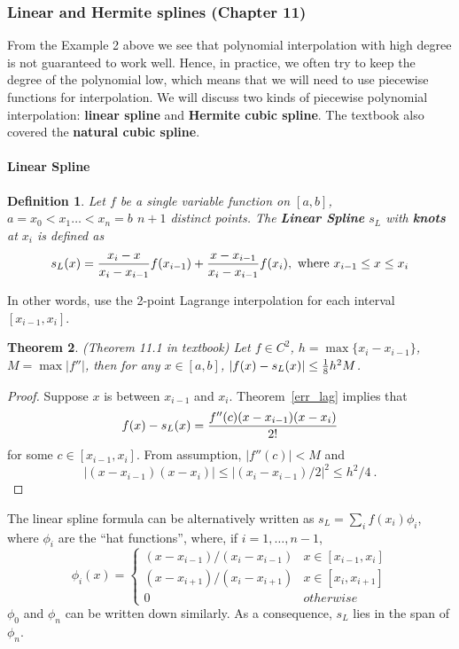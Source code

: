\documentclass[20pt]{article} %
\theoremstyle{break}
\newtheorem{definition}{Definition}[section]
\newtheorem{thm}[definition]{Theorem}
\begin{document}
\subsubsection{Linear and Hermite splines (Chapter 11)}

From the Example 2 above we see that polynomial interpolation with high degree is not guaranteed to work well. Hence, in practice, we often try to keep the degree of the polynomial low, which means that we will need to use piecewise functions for interpolation. We will discuss two kinds of piecewise polynomial interpolation: {\bf linear spline} and {\bf Hermite cubic spline}. The textbook also covered the {\bf natural cubic spline}.

\paragraph{Linear Spline}

\begin{definition}
  Let $f$ be a single variable function on $[a, b]$, $a=x_0<x_1\dots <x_n=b$ $n+1$ distinct points. The {\bf Linear Spline} $s_L$ with {\bf knots} at $x_i$ is defined as
  \[s_L(x)={x_i-x\over x_i-x_{i-1}}f(x_{i-1})+{x-x_{i-1}\over x_i-x_{i-1}}f(x_i), \text{ where }x_{i-1}\leq x\leq x_i\]
\end{definition}
In other words, use the 2-point Lagrange interpolation for each interval $[x_{i-1}, x_i]$.\\

\newpage

\begin{thm}\label{err_spline_lin} (Theorem 11.1 in textbook)
Let $f\in C^2$, $h=\max\{x_i-x_{i-1}\}$, $M=\max|f''|$, then for any $x\in [a, b]$, $|f(x)-s_L(x)|\leq {1\over 8}h^2M$.
\end{thm}

\begin{proof}
  Suppose $x$ is between $x_{i-1}$ and $x_i$. Theorem~\ref{err_lag} implies that
  \[f(x)-s_L(x)={f''(c)(x-x_{i-1})(x-x_i)\over 2!}\]
  for some $c\in [x_{i-1}, x_i]$. From assumption, $|f''(c)|<M$ and
  \[|(x-x_{i-1})(x-x_i)|\leq|(x_i-x_{i-1})/2|^2\leq h^2/4\ .\]
\end{proof}

The linear spline formula can be alternatively written as $s_L=\sum_if(x_i)\phi_i$, where $\phi_i$ are the ``hat functions'', where, if $i=1, \dots, n-1$,
\[\phi_i(x)=\begin{cases} (x-x_{i-1})/(x_i-x_{i-1}) & x\in [x_{i-1}, x_i]\\
    (x-x_{i+1})/(x_i-x_{i+1}) & x\in [x_i, x_{i+1}] \\ 0 & otherwise \end{cases}\]
$\phi_0$ and $\phi_n$ can be written down similarly. As a consequence, $s_L$ lies in the span of $\phi_n$. \\
\end{document}
